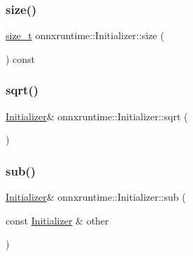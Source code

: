\mbox{\label{classonnxruntime_1_1Initializer_a77022bec74ca93ec68e54c85e085c093}} 
\subsubsection{\texorpdfstring{size()}{size()}}
{\footnotesize\ttfamily \mbox{\hyperlink{mlasi_8h_a503efbc1c6e50825320ad909366b78ab}{size\+\_\+t}} onnxruntime\+::\+Initializer\+::size (\begin{DoxyParamCaption}{ }\end{DoxyParamCaption}) const\hspace{0.3cm}{\ttfamily [inline]}}

\mbox{\label{classonnxruntime_1_1Initializer_ab38c8378dfec6df57396dffe19ecdf79}} 
\subsubsection{\texorpdfstring{sqrt()}{sqrt()}}
{\footnotesize\ttfamily \mbox{\hyperlink{classonnxruntime_1_1Initializer}{Initializer}}\& onnxruntime\+::\+Initializer\+::sqrt (\begin{DoxyParamCaption}{ }\end{DoxyParamCaption})\hspace{0.3cm}{\ttfamily [inline]}}

\mbox{\label{classonnxruntime_1_1Initializer_a20381c51daf3386b459ca6cbbd770fb5}} 
\subsubsection{\texorpdfstring{sub()}{sub()}}
{\footnotesize\ttfamily \mbox{\hyperlink{classonnxruntime_1_1Initializer}{Initializer}}\& onnxruntime\+::\+Initializer\+::sub (\begin{DoxyParamCaption}\item[{const \mbox{\hyperlink{classonnxruntime_1_1Initializer}{Initializer}} \&}]{other }\end{DoxyParamCaption})\hspace{0.3cm}{\ttfamily [inline]}}

